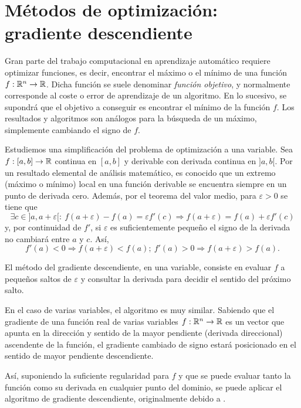 \section{Métodos de optimización: gradiente
descendiente}\label{muxe9todos-de-optimizaciuxf3n-gradiente-descendiente}

\label{sec:grad-desc}

Gran parte del trabajo computacional en aprendizaje automático requiere
optimizar funciones, es decir, encontrar el máximo o el mínimo de una
función \(f:\mathbb{R}^n\rightarrow \mathbb{R}\). Dicha función se suele denominar
\emph{función objetivo}, y normalmente corresponde al coste o error de
aprendizaje de un algoritmo. En lo sucesivo, se supondrá que el objetivo
a conseguir es encontrar el mínimo de la función \(f\). Los resultados y
algoritmos son análogos para la búsqueda de un máximo, simplemente
cambiando el signo de \(f\).

Estudiemos una simplificación del problema de optimización a una
variable. Sea \(f:[a,b]\rightarrow\mathbb{R}\) continua en \([a,b]\) y
derivable con derivada continua en \(]a,b[\). Por un resultado elemental
de análisis matemático, es conocido que un extremo (máximo o mínimo)
local en una función derivable se encuentra siempre en un punto de
derivada cero. Además, por el teorema del valor medio, para
\(\varepsilon>0\) se tiene que
\[\exists c\in ]a, a+\varepsilon[ :\ f(a+\varepsilon)-f(a)=\varepsilon f'(c)\Rightarrow f(a+\varepsilon)=f(a) + \varepsilon f'(c)\]
y, por continuidad de \(f'\), si \(\varepsilon\) es suficientemente
pequeño el signo de la derivada no cambiará entre \(a\) y \(c\). Así,
\[f'(a)<0\Rightarrow f(a+\varepsilon) < f(a);\ f'(a)>0\Rightarrow f(a+\varepsilon) > f(a).\]

El método del gradiente descendiente, en una variable, consiste en
evaluar \(f\) a pequeños saltos de \(\varepsilon\) y consultar la
derivada para decidir el sentido del próximo salto.

En el caso de varias variables, el algoritmo es muy similar. Sabiendo
que el gradiente de una función real de varias variables
\(f:\mathbb{R}^n\rightarrow \mathbb{R}\) es un vector que apunta en la dirección y
sentido de la mayor pendiente (derivada direccional) ascendente de la
función, el gradiente cambiado de signo estará posicionado en el sentido
de mayor pendiente descendiente.

Así, suponiendo la suficiente regularidad para \(f\) y que se puede
evaluar tanto la función como su derivada en cualquier punto del
dominio, se puede aplicar el algoritmo de gradiente descendiente,
originalmente debido a \textcite{cauchy1847}.

